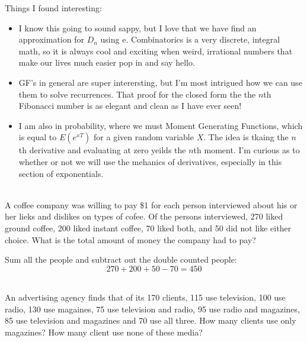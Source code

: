 \documentclass[12pt,letterpaper,boxed]{hmcpset}
\begin{document}

Things I found interesting:
\begin{itemize}
\item I know this going to sound sappy, but I love that we have find an approximation for $D
_n$ using e. Combinatorics is a very discrete, integral math, so it is always cool and exciting when weird, irrational numbers that make our lives much easier pop in and say hello.
\item GF's in general are super interersting, but I'm most intrigued how we can use them to solve recurrences. That proof for the closed form the the $n$th Fibonacci number is as elegant and clean as I have ever seen!
\item I am also in probability, where we must Moment Generating Functions, which is equal to $E(e^{xT})$ for a given random variable $X$. The idea is tkaing the $n$th derivative and evaluating at zero yeilds the $n$th moment. I'm curious as to whether or not we will use the mehanics of derivatives, especially in this section of exponentials.
\end{itemize}

\begin{problem}[Shahriari 8.1.1][20]\\
A coffee company was willing to pay \$1 for each person interviewed about his or her lieks and dislikes on types of cofee. Of the persons interviewed, 270 liked ground coffee, 200 liked instant coffee, 70 liked both, and 50 did not like either choice. What is the total amount of money the company had to pay?
\end{problem}

\begin{solution}
Sum all the people and subtract out the double counted people:
$$270+200+50-70 = \boxed{450}$$
\end{solution}

\begin{problem}[Shahriari 8.1.3][20]\\
An advertising agency finds that of its 170 clients, 115 use television, 100 use radio, 130 use magaines, 75 use television and radio, 95 use radio and magazines, 85 use television and magazines and 70 use all three. How many clients use only magazines? How many client use none of these media?
\end{problem}
\end{document}
